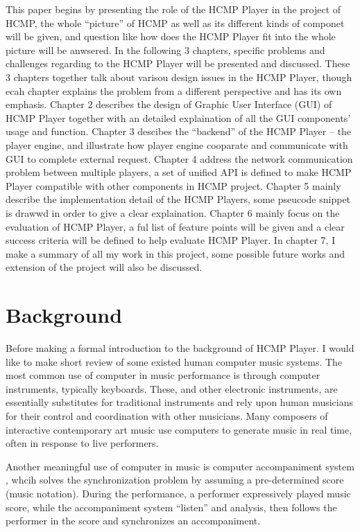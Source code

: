 This paper begins by presenting the role of the HCMP Player in the project
of HCMP, the whole ``picture'' of HCMP as well as its different kinds of 
componet will be given, and question like how does the HCMP Player fit 
into the whole picture will be anwsered. In the following 3 chapters, 
specific problems and challenges regarding to the HCMP Player will be 
presented and discussed. These 3 chapters together talk about varisou design 
issues in the HCMP Player, though ecah chapter 
explains the problem from a different perspective and has its own emphasis. 
Chapter 2 describes the design of Graphic User 
Interface (GUI) of HCMP Player together with an detailed explaination of 
all the GUI components' usage and function. 
Chapter 3 descibes the ``backend'' of the HCMP Player -- the player engine, and 
illustrate how player engine cooparate and communicate with GUI to complete 
external request.
Chapter 4 address the network communication problem between 
multiple players, a set of unified API is defined to make HCMP Player compatible 
with other components in HCMP project. Chapter 5 mainly describe the 
implementation detail of the HCMP Players, some pseucode snippet is drawwd 
in order to give a clear explaination. Chapter 6 
mainly focus on the evaluation of HCMP Player, a ful list of feature points will 
be given and a clear success criteria will be defined to help evaluate HCMP 
Player. In chapter 7, 
I make a summary of all my work in this project, some possible future works and
extension of the project will also be discussed.

\section{Background}
Before making a formal introduction to the background of HCMP Player. 
I would like to make short review of  
some existed human computer music systems. The most common use of computer in
music performance is through computer instruments, typically keyboards.
These, and other electronic instruments, are essentially substitutes for traditional
instruments and rely upon human musicians for their control and coordination with
other musicians. Many composers of interactive contemporary art music use computers
to generate music in real time, often in response to live performers.

Another meaningful use of computer in music is computer accompaniment system 
\cite{Roger:89}, 
whcih solves the synchronization problem by assuming a pre-determined 
score (music notation). During the performance, a performer expressively 
played music score, while the accompaniment system ``listen'' and analysis, 
then follows the performer 
in the score and synchronizes an accompaniment.

